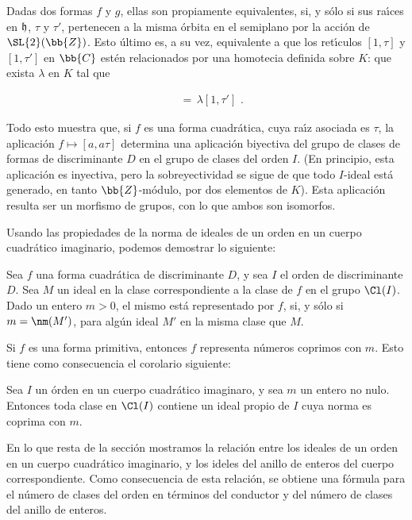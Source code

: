 Dadas dos formas $f$ y $g$, ellas son propiamente equivalentes,
si, y s\'{o}lo si sus ra\'{\i}ces en $\frak{h}$, $\tau$ y $\tau'$,
pertenecen a la misma \'{o}rbita en el semiplano por la acci\'{o}n de
$\SL{2}(\bb{Z})$. Esto \'{u}ltimo es, a su vez, equivalente a que los
ret\'{\i}culos $[1,\tau]$ y $[1,\tau']$ en $\bb{C}$ est\'{e}n
relacionados por una homotecia definida sobre $K$: que exista $\lambda$
en $K$ tal que

\begin{align*}
[1,\tau] & \,=\,\lambda [1,\tau']
\text{ .}
\end{align*}

Todo esto muestra que, si $f$ es una forma cuadr\'{a}tica, cuya
ra\'{\i}z asociada es $\tau$, la aplicaci\'{o}n
$f\mapsto[a,a\tau]$ determina una aplicaci\'{o}n biyectiva
del grupo de clases de formas de discriminante $D$ en el grupo de
clases del orden $I$. (En principio, esta aplicaci\'{o}n es inyectiva,
pero la sobreyectividad se sigue de que todo $I$-ideal est\'{a}
generado, en tanto $\bb{Z}$-m\'{o}dulo, por dos elementos de $K$).
Esta aplicaci\'{o}n resulta ser un morfismo de grupos, con lo que
ambos son isomorfos.

Usando las propiedades de la norma de ideales de un orden en un cuerpo
cuadr\'{a}tico imaginario, podemos demostrar lo siguiente:

\begin{propoRepEnterosNormaIdeal}
Sea $f$ una forma cuadr\'{a}tica de discriminante $D$,
y sea $I$ el orden de discriminante $D$.
Sea $M$ un ideal en la clase correspondiente a la clase de $f$
en el grupo $\Cl(I)$. Dado un entero $m>0$, el mismo est\'{a}
representado por $f$, si, y s\'{o}lo si $m=\nm(M')$, para alg\'{u}n
ideal $M'$ en la misma clase que $M$.
\end{propoRepEnterosNormaIdeal}

Si $f$ es una forma primitiva, entonces $f$ representa n\'{u}meros
coprimos con $m$. Esto tiene como consecuencia el corolario
siguiente:

\begin{coroRepEnterosNormaIdeal}
Sea $I$ un \'{o}rden en un cuerpo cuadr\'{a}tico imaginaro, y sea $m$
un entero no nulo. Entonces toda clase en $\Cl(I)$ contiene un
ideal propio de $I$ cuya norma es coprima con $m$.
\end{coroRepEnterosNormaIdeal}

En lo que resta de la secci\'{o}n mostramos la relaci\'{o}n entre los
ideales de un orden en un cuerpo cuadr\'{a}tico imaginario, y los
ideles del anillo de enteros del cuerpo correspondiente. Como
consecuencia de esta relaci\'{o}n, se obtiene una f\'{o}rmula para
el n\'{u}mero de clases del orden en t\'{e}rminos del conductor y del
n\'{u}mero de clases del anillo de enteros.

